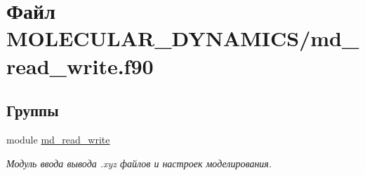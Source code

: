 \hypertarget{md__read__write_8f90}{}\section{Файл M\+O\+L\+E\+C\+U\+L\+A\+R\+\_\+\+D\+Y\+N\+A\+M\+I\+C\+S/md\+\_\+read\+\_\+write.f90}
\label{md__read__write_8f90}
\subsection*{Группы}
\begin{DoxyCompactItemize}
\item 
module \mbox{\hyperlink{namespacemd__read__write}{md\+\_\+read\+\_\+write}}
\begin{DoxyCompactList}\small\item\em Модуль ввода вывода .xyz файлов и настроек моделирования. \end{DoxyCompactList}\end{DoxyCompactItemize}
